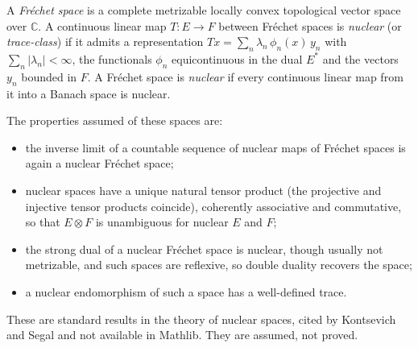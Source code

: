\begin{definition}
  \label{def:nuclear-frechet}
  \notready
  A \emph{Fréchet space} is a complete metrizable locally convex topological
  vector space over $\mathbb C$. A continuous linear map $T \colon E \to F$
  between Fréchet spaces is \emph{nuclear} (or \emph{trace-class}) if it admits
  a representation $T x = \sum_n \lambda_n\, \phi_n(x)\, y_n$ with
  $\sum_n |\lambda_n| < \infty$, the functionals $\phi_n$ equicontinuous in the
  dual $E^*$ and the vectors $y_n$ bounded in $F$. A Fréchet space is
  \emph{nuclear} if every continuous linear map from it into a Banach space is
  nuclear.

  The properties assumed of these spaces are:
  \begin{itemize}
    \item the inverse limit of a countable sequence of nuclear maps of Fréchet
      spaces is again a nuclear Fréchet space;
    \item nuclear spaces have a unique natural tensor product (the projective
      and injective tensor products coincide), coherently associative and
      commutative, so that $E \otimes F$ is unambiguous for nuclear $E$ and $F$;
    \item the strong dual of a nuclear Fréchet space is nuclear, though usually
      not metrizable, and such spaces are reflexive, so double duality recovers
      the space;
    \item a nuclear endomorphism of such a space has a well-defined trace.
  \end{itemize}

  These are standard results in the theory of nuclear spaces, cited by
  Kontsevich and Segal and not available in Mathlib. They are assumed, not
  proved.
\end{definition}

